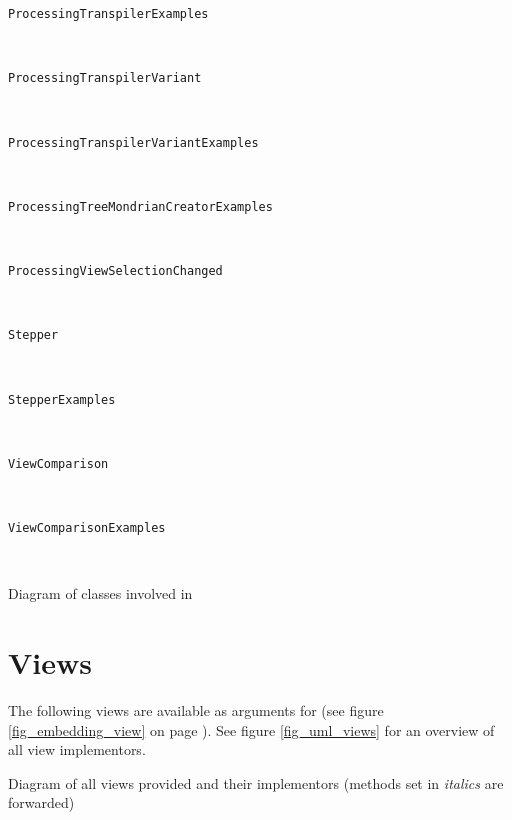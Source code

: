 \begin{description}
\item[\texttt{ProcessingTranspilerExamples}] \hfill \\
	
\item[\texttt{ProcessingTranspilerVariant}] \hfill \\
	
\item[\texttt{ProcessingTranspilerVariantExamples}] \hfill \\
	
\item[\texttt{ProcessingTreeMondrianCreatorExamples}] \hfill \\
	
\item[\texttt{ProcessingViewSelectionChanged}] \hfill \\
	
\item[\texttt{Stepper}] \hfill \\
	
\item[\texttt{StepperExamples}] \hfill \\
	
\item[\texttt{ViewComparison}] \hfill \\
	
\item[\texttt{ViewComparisonExamples}] \hfill \\
	

\end{description}


\begin{cfigure}{Diagram of classes involved in }

\end{cfigure}


\section{Views}

The following views are available as arguments for  (see figure \ref{fig_embedding_view} on page \pageref{fig_embedding_view}). See figure \ref{fig_uml_views} for an overview of all view implementors.

\begin{cfigure}{Diagram of all views provided and their implementors (methods set in \textit{italics} are forwarded)}

\end{cfigure}

